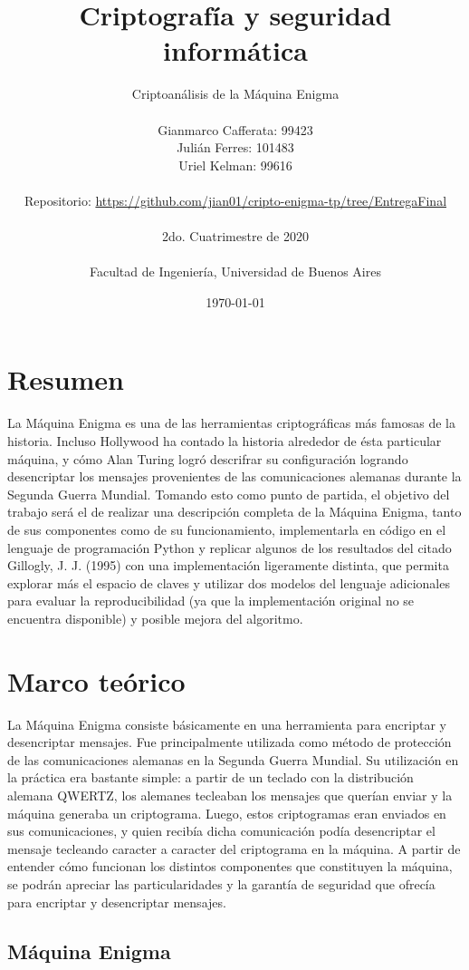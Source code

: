 \documentclass[a4paper,10pt]{article}
\title{ \Huge \textbf {Criptografía y seguridad informática}}
\author{
  \Huge Criptoanálisis de la Máquina Enigma\\
  \\
    \LARGE {Gianmarco Cafferata: 99423} \\
  \LARGE {Julián Ferres: 101483} \\
  \LARGE {Uriel Kelman: 99616} \\
  \\
  Repositorio: \href{https://github.com/jian01/cripto-enigma-tp/tree/EntregaFinal}{https://github.com/jian01/cripto-enigma-tp/tree/EntregaFinal} \\
  \\

  \LARGE   2do. Cuatrimestre de 2020 \\
  \\
  \LARGE  Facultad de Ingeniería, Universidad de Buenos Aires  \\}
\date{\today}
\begin{document}
  \maketitle
  \thispagestyle{empty}
  \newpage
  \tableofcontents
  \newpage

\section{Resumen}


La Máquina Enigma es una de las herramientas criptográficas más famosas de la historia. Incluso Hollywood ha contado la historia alrededor de ésta particular máquina, y cómo Alan Turing logró descrifrar su configuración logrando desencriptar los mensajes provenientes de las comunicaciones alemanas durante la Segunda Guerra Mundial. Tomando esto como punto de partida, el objetivo del trabajo será el de realizar una descripción completa de la Máquina Enigma, tanto de sus componentes como de su funcionamiento, implementarla en código en el lenguaje de programación Python y replicar algunos de los resultados del citado Gillogly, J. J. (1995)\cite{gillogly} con una implementación ligeramente distinta, que permita explorar más el espacio de claves y utilizar dos modelos del lenguaje adicionales para evaluar la reproducibilidad (ya que la implementación original no se encuentra disponible) y posible mejora del algoritmo.

\section{Marco teórico}

La Máquina Enigma consiste básicamente en una herramienta para encriptar y desencriptar mensajes. Fue principalmente utilizada como método de protección de las comunicaciones alemanas en la Segunda Guerra Mundial. Su utilización en la práctica era bastante simple: a partir de un teclado con la distribución alemana QWERTZ, los alemanes tecleaban los mensajes que querían enviar y la máquina generaba un criptograma. Luego, estos criptogramas eran enviados en sus comunicaciones, y quien recibía dicha comunicación podía desencriptar el mensaje tecleando caracter a caracter del criptograma en la máquina. A partir de entender cómo funcionan los distintos componentes que constituyen la máquina, se podrán apreciar las particularidades y la garantía de seguridad que ofrecía para encriptar y desencriptar mensajes.

\subsection{Máquina Enigma}
\end{document}
